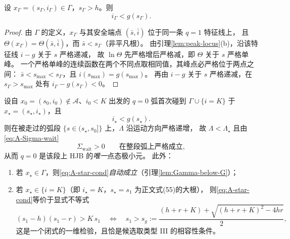 \begin{lemma}[切换点位于峰值曲线之下]
\label{lem:Gamma-below-G}
设 $x_\Gamma=(s_\Gamma,i_\Gamma)\in\Gamma$，$s_\Gamma>h$。则
\begin{equation}
  i_\Gamma<g(s_\Gamma).
  \label{eq:A-Gamma-below}
\end{equation}
\end{lemma}

\begin{proof}
由 $\Gamma$ 的定义，$x_\Gamma$ 与其安全端点 $(\bar s,\bar i)$ 位于同一条 $q=1$ 特征线上，
且 $\Theta(x_\Gamma)=\Theta(\bar s,\bar i)$，而 $\bar s<s_\Gamma$（非平凡根）。
由引理\ref{lem:peak-locus}(b)，沿该特征线 $i-g$ 关于 $s$ 严格递减，
故 $\ln\Theta$ 先严格增后严格减，即 $\Theta$ 关于 $s$ 严格单峰。
一个严格单峰的连续函数在两个不同点取相同值，其峰点必严格位于两点之间：
$\bar s<s_{\max}<s_\Gamma$，且 $i(s_{\max})=g(s_{\max})$。
再由 $i-g$ 关于 $s$ 严格递减，在 $s_\Gamma>s_{\max}$ 处有 $i_\Gamma-g(s_\Gamma)<0$。
\end{proof}

\begin{theorem}[等待弧上切换函数严格为正]
\label{thm:wait-Sigma-positive}
设自 $x_0=(s_0,i_0)\notin\mathcal{A}$、$i_0<K$ 出发的 $q=0$ 弧首次碰到
$\Gamma\cup\{i=K\}$ 于 $x_\star=(s_\star,i_\star)$，且
\begin{equation}
  i_\star<g(s_\star).
  \label{eq:A-star-cond}
\end{equation}
则在被走过的弧段 $\{s\in(s_\star,s_0]\}$ 上，$\Lambda$ 沿运动方向严格递增，
故 $\Lambda<\Lambda_\star$ 且由\eqref{eq:A-Sigma-wait}
\begin{equation}
  \Sigma_{\mathrm{wait}}>0
  \qquad\text{在整段弧上严格成立},
\end{equation}
从而 $q=0$ 是该段上 HJB 的\emph{唯一}点态极小元。
此外：
\begin{enumerate}
\item[(a)] 若 $x_\star\in\Gamma$，则\eqref{eq:A-star-cond}\emph{自动成立}（引理\ref{lem:Gamma-below-G}）；
\item[(b)] 若 $x_\star\in\{i=K\}$（即 $i_\star=K$，$s_\star=s_1$ 为正文式(55)的大根），
      则\eqref{eq:A-star-cond}等价于显式不等式
      \begin{equation}
        (s_1-h)(s_1-r)>K\,s_1
        \quad\Longleftrightarrow\quad
        s_1>s_g:=\frac{(h+r+K)+\sqrt{(h+r+K)^2-4hr}}{2},
        \label{eq:A-typeIII-check}
      \end{equation}
      这是一个闭式的一维检验，且恰是候选取类型 III 的相容性条件。
\end{enumerate}
\end{theorem}

